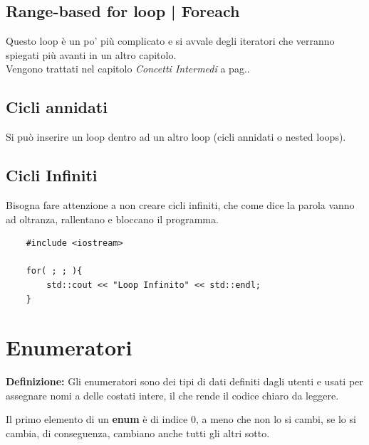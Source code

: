 \subsection{Range-based for loop | Foreach}

\textsf{\small Questo loop è un po' più complicato e si avvale degli iteratori che verranno spiegati più avanti in un altro capitolo.} \\

\textsf{\small Vengono trattati nel capitolo \emph{Concetti Intermedi} a pag.\textbf{\pageref{foreach}}.} \\

\subsection{Cicli annidati}

\textsf{\small Si può inserire un loop dentro ad un altro loop (cicli annidati o nested loops).} \\

\subsection{Cicli Infiniti}

\textsf{\small Bisogna fare attenzione a non creare cicli infiniti, che come dice la parola vanno ad oltranza, rallentano e bloccano il programma.}\\

\begin{lstlisting}
	#include <iostream>
	
	for( ; ; ){
		std::cout << "Loop Infinito" << std::endl;
	}
\end{lstlisting}


\section{Enumeratori}

\textsf{\small \textbf{Definizione: } Gli enumeratori sono dei tipi di dati definiti dagli utenti e usati per assegnare nomi a delle costati intere, il che rende il codice chiaro da leggere.}

\textsf{\small Il primo elemento di un \textbf{enum} è di indice 0, a meno che non lo si cambi, se lo si cambia, di conseguenza, cambiano anche tutti gli altri sotto.} \\


